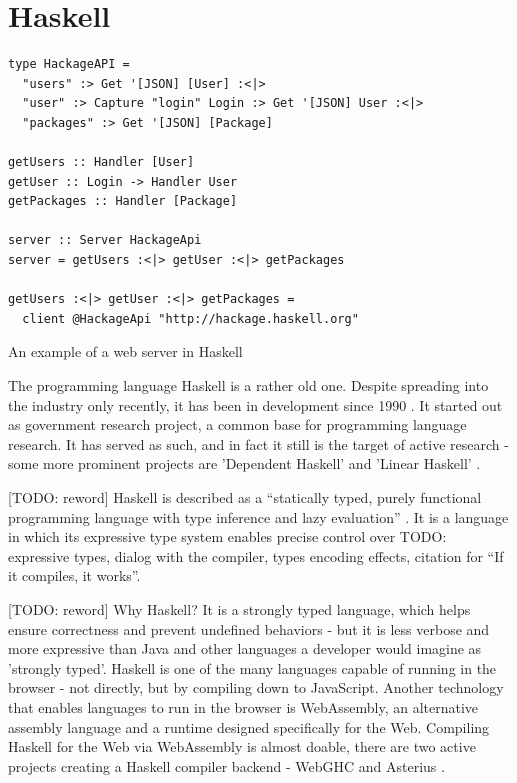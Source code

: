 \documentclass[english,odsaz]{fitthesis}
\begin{document}
\section{Haskell}
\label{sec:orgd6a8224}
\begin{listing}[htbp]
\begin{verbatim}
type HackageAPI =
  "users" :> Get '[JSON] [User] :<|>
  "user" :> Capture "login" Login :> Get '[JSON] User :<|>
  "packages" :> Get '[JSON] [Package]

getUsers :: Handler [User]
getUser :: Login -> Handler User
getPackages :: Handler [Package]

server :: Server HackageApi
server = getUsers :<|> getUser :<|> getPackages

getUsers :<|> getUser :<|> getPackages =
  client @HackageApi "http://hackage.haskell.org"
\end{verbatim}
\caption{An example of a web server in Haskell}
\end{listing}

The programming language Haskell is a rather old one. Despite spreading into the
industry only recently, it has been in development since 1990
\cite{haskell_history}. It started out as government research project, a common
base for programming language research. It has served as such, and in fact it
still is the target of active research - some more prominent projects are
'Dependent Haskell' \cite{eisenberg2016dependent} and 'Linear Haskell'
\cite{bernardy2017linear}.

[TODO: reword] Haskell is described as a ``statically typed, purely functional
programming language with type inference and lazy evaluation''
\cite{jones2003haskell}. It is a language in which its expressive type system
enables precise control over TODO: expressive types, dialog with the compiler,
types encoding effects, citation for ``If it compiles, it works''.

[TODO: reword] Why Haskell? It is a strongly typed language, which helps ensure
correctness and prevent undefined behaviors - but it is less verbose and more
expressive than Java and other languages a developer would imagine as 'strongly
typed'. Haskell is one of the many languages capable of running in the browser -
not directly, but by compiling down to JavaScript. Another technology that
enables languages to run in the browser is WebAssembly, an alternative assembly
language and a runtime designed specifically for the Web. Compiling Haskell for
the Web via WebAssembly is almost doable, there are two active projects creating
a Haskell compiler backend - WebGHC \cite{webghc} and Asterius \cite{asterius}.
\end{document}
